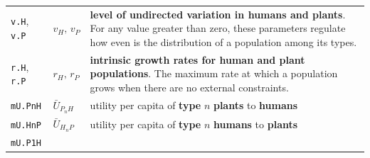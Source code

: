 \documentclass[
]{book}
\begin{document}
\begin{longtable}[]{@{}lll@{}}
\begin{minipage}[t]{0.27\columnwidth}
\texttt{v.H}, \texttt{v.P}\strut
\end{minipage} & \begin{minipage}[t]{0.25\columnwidth}\raggedright
\(v_{H},\,v_{P}\)\strut
\end{minipage} & \begin{minipage}[t]{0.40\columnwidth}\raggedright
\textbf{level of undirected variation in humans and plants}. For any value greater than zero, these parameters regulate how even is the distribution of a population among its types.\strut
\end{minipage}\tabularnewline
\begin{minipage}[t]{0.27\columnwidth}\raggedright
\texttt{r.H}, \texttt{r.P}\strut
\end{minipage} & \begin{minipage}[t]{0.25\columnwidth}\raggedright
\(r_{H},\,r_{P}\)\strut
\end{minipage} & \begin{minipage}[t]{0.40\columnwidth}\raggedright
\textbf{intrinsic growth rates for human and plant populations}. The maximum rate at which a population grows when there are no external constraints.\strut
\end{minipage}\tabularnewline
\begin{minipage}[t]{0.27\columnwidth}\raggedright
\texttt{mU.PnH}\strut
\end{minipage} & \begin{minipage}[t]{0.25\columnwidth}\raggedright
\(\bar{U}_{P_{n}H}\)\strut
\end{minipage} & \begin{minipage}[t]{0.40\columnwidth}\raggedright
utility per capita of \textbf{type} \(n\) \textbf{plants} to \textbf{humans}\strut
\end{minipage}\tabularnewline
\begin{minipage}[t]{0.27\columnwidth}\raggedright
\texttt{mU.HnP}\strut
\end{minipage} & \begin{minipage}[t]{0.25\columnwidth}\raggedright
\(\bar{U}_{H_{n}P}\)\strut
\end{minipage} & \begin{minipage}[t]{0.40\columnwidth}\raggedright
utility per capita of \textbf{type} \(n\) \textbf{humans} to \textbf{plants}\strut
\end{minipage}\tabularnewline
\begin{minipage}[t]{0.27\columnwidth}\raggedright
\texttt{mU.P1H}\strut
\end{minipage} & \begin{minipage}[t]{0.25\columnwidth}\raggedright

\end{minipage}
\end{longtable}
\end{document}
